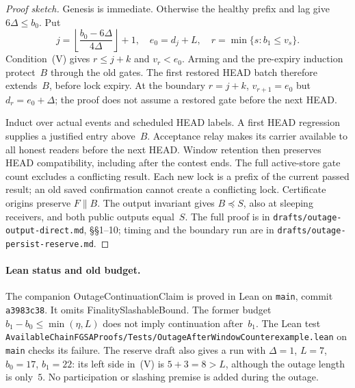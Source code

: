 \documentclass{article}
\theoremstyle{plain}
\theoremstyle{definition}
\theoremstyle{remark}
\begin{document}
\begin{proof}[Proof sketch]
Genesis is immediate.  Otherwise the healthy prefix and lag give
$6\Delta\leq b_0$.  Put
\[
 j=\left\lfloor\frac{b_0-6\Delta}{4\Delta}\right\rfloor+1,
 \quad e_0=d_j+L,\quad r=\min\{s:b_1\leq v_s\}.
\]
Condition~(V) gives $r\leq j+k$ and $v_r<e_0$.  Arming and the
pre-expiry induction protect~$B$ through the old gates.  The first
restored HEAD batch therefore extends~$B$, before lock expiry.
At the boundary $r=j+k$, $v_{r+1}=e_0$ but $d_r=e_0+\Delta$;
the proof does not assume a restored gate before the next HEAD.

Induct over actual events and scheduled HEAD labels.  A first HEAD
regression supplies a justified entry above~$B$.  Acceptance relay
makes its carrier available to all honest readers before the next
HEAD.  Window retention then preserves HEAD compatibility, including
after the contest ends.  The full active-store gate count excludes
a conflicting result.  Each new lock is a prefix of the current
passed result; an old saved confirmation cannot create a conflicting
lock.  Certificate origins preserve $F\parallel B$.  The output
invariant gives $B\preceq S$, also at sleeping receivers, and both
public outputs equal~$S$.
The full proof is in \nolinkurl{drafts/outage-output-direct.md},
\S\S1--10; timing and the boundary run are in
\nolinkurl{drafts/outage-persist-reserve.md}.
\end{proof}

\paragraph{Lean status and old budget.}
The companion \textsf{OutageContinuationClaim} is proved in Lean on
\texttt{main}, commit \texttt{a3983c38}.  It omits
\textsf{FinalitySlashableBound}.  The former budget
$b_1-b_0\leq\min(\eta,L)$ does not imply continuation after~$b_1$.
The Lean test \newline\texttt{AvailableChainFGSAProofs/Tests/OutageAfterWindowCounterexample.lean}\newline
on \texttt{main} checks its failure.  The reserve draft also gives a run with
$\Delta=1$, $L=7$, $b_0=17$, $b_1=22$: its left side in~(V) is
$5+3=8>L$, although the outage length is only~$5$.  No participation
or slashing premise is added during the outage.
\end{document}
